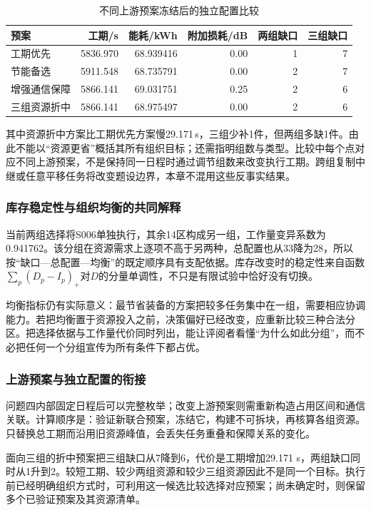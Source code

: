 \documentclass[withoutpreface,colorprint]{format}
\numberwithin{equation}{section}
\numberwithin{figure}{section}
\numberwithin{table}{section}
\begin{document}
\begin{table}[htbp]\centering\small
\caption{不同上游预案冻结后的独立配置比较}\label{tab:q4_crossplans}
\begin{tabular}{@{}lrrrrr@{}}
\toprule
预案 & 工期/s & 能耗/kWh & 附加损耗/dB & 两组缺口 & 三组缺口\\
\midrule
工期优先 & 5836.970 & 68.939416 & 0.00 & 1 & 7\\
节能备选 & 5911.548 & 68.735791 & 0.00 & 2 & 7\\
增强通信保障 & 5866.141 & 69.031751 & 0.25 & 2 & 6\\
三组资源折中 & 5866.141 & 68.975497 & 0.00 & 2 & 6\\
\bottomrule
\end{tabular}
\end{table}


其中资源折中方案比工期优先方案慢29.171\,s，三组少补1件，但两组多缺1件。由此不能以“资源更省”概括其所有组织目标；还需指明组数与类型。比较中每个点对应不同上游预案，不是保持同一日程时通过调节组数来改变执行工期。跨组复制中继或任意平移任务将改变题设边界，本章不混用这些反事实结果。


\subsubsection{库存稳定性与组织均衡的共同解释}
当前两组选择将S006单独执行，其余14区构成另一组，工作量变异系数为0.941762。该分组在资源需求上逐项不高于另两种，总配置也从33降为28，所以按“缺口—总配置—均衡”的既定顺序具有支配依据。库存改变时的稳定性来自函数$\sum_p(D_p-I_p)_+$对$D$的分量单调性，不只是有限试验中恰好没有切换。

均衡指标仍有实际意义：最节省装备的方案把较多任务集中在一组，需要相应协调能力。若把均衡置于资源投入之前，决策偏好已经改变，应重新比较三种合法分区。把选择依据与工作量代价同时列出，能让评阅者看懂“为什么如此分组”，而不必把任何一个分组宣传为所有条件下都占优。

\subsubsection{上游预案与独立配置的衔接}
问题四内部固定日程后可以完整枚举；改变上游预案则需重新构造占用区间和通信关联。计算顺序是：验证新联合预案，冻结它，构建不可拆块，再核算各组资源。只替换总工期而沿用旧资源峰值，会丢失任务重叠和保障关系的变化。

面向三组的折中预案把三组缺口从7降到6，代价是工期增加29.171 s，两组缺口同时从1升到2。较短工期、较少两组资源和较少三组资源因此不是同一个目标。执行前已经明确组织方式时，可利用这一候选比较选择对应预案；尚未确定时，则保留多个已验证预案及其资源清单。
\end{document}

